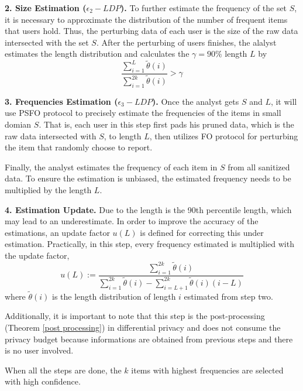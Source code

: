 \documentclass[conference]{IEEEtran}
\begin{document}
\textbf{2. Size Estimation ($\epsilon_2-LDP$).} To further estimate the frequency of the set $S$, it is necessary to approximate the distribution of the number of frequent items that users hold. Thus, the perturbing data of each user is the size of the raw data intersected with the set $S$. After the perturbing of users finishes, the alalyst estimates the length distribution and calculates the $\gamma = 90\%$ length $L$ by  
\begin{equation}
\frac{\sum_{i=1}^{L} \tilde{\theta}(i)}{\sum_{i=1}^{2k} \tilde{\theta}(i)} > \gamma
\end{equation}

\textbf{3. Frequencies Estimation ($\epsilon_3-LDP$).} Once the analyst gets $S$ and $L$, it will use PSFO protocol to precisely estimate the frequencies of the items in small domian $S$. That is, each user in this step first pads his pruned data, which is the raw data intersected with $S$, to length $L$, then
utilizes FO protocol for perturbing the item that randomly choose to report. 

Finally, the analyst estimates the frequency of each item in $S$ from all sanitized data. To ensure the estimation is unbiased, the estimated frequency needs to be multiplied by the length $L$.

\textbf{4. Estimation Update.} Due to the length is the 90th percentile length, which may lead to an underestimate. In order to improve the accuracy of the estimations, an update factor $u(L)$ is defined for correcting this under estimation. Practically, in this step, every frequency estimated is multiplied with the update factor,
$$u(L) := \frac{\sum_{i=1}^{2k} \tilde{\theta}(i)}{\sum_{i=1}^{2k} \tilde{\theta}(i) - \sum_{i=L+1}^{2k} \tilde{\theta}(i)(i-L) }$$
where $\tilde{\theta}(i)$ is the length distribution of length $i$ estimated from step two.

Additionally, it is important to note that this step is the post-processing (Theorem \ref{post processing}) in differential privacy and does not consume the privacy budget because informations are obtained from previous steps and there is no user involved. 

When all the steps are done, the $k$ items with highest frequencies are selected with high confidence.

\end{document}
